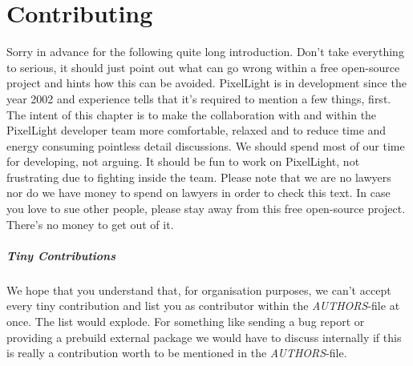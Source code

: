 \chapter{Contributing}
Sorry in advance for the following quite long introduction. Don't take everything to serious, it should just point out what can go wrong within a free open-source project and hints how this can be avoided. PixelLight is in development since the year 2002 and experience tells that it's required to mention a few things, first. The intent of this chapter is to make the collaboration with and within the PixelLight developer team more comfortable, relaxed and to reduce time and energy consuming pointless detail discussions. We should spend most of our time for developing, not arguing. It should be fun to work on PixelLight, not frustrating due to fighting inside the team. Please note that we are no lawyers nor do we have money to spend on lawyers in order to check this text. In case you love to sue other people, please stay away from this free open-source project. There's no money to get out of it.


\paragraph{Tiny Contributions}
We hope that you understand that, for organisation purposes, we can't accept every tiny contribution and list you as contributor within the \emph{AUTHORS}-file at once. The list would explode. For something like sending a bug report or providing a prebuild external package we would have to discuss internally if this is really a contribution worth to be mentioned in the \emph{AUTHORS}-file.


